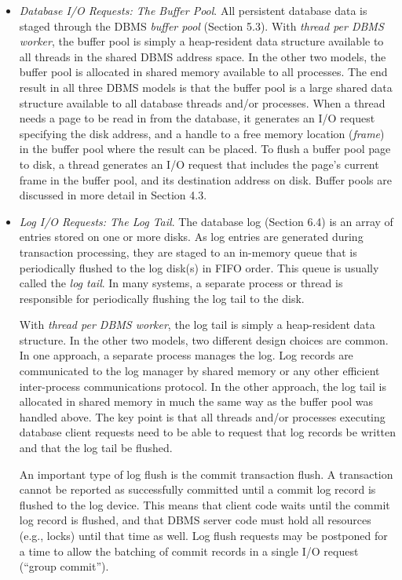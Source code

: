 \documentclass[a4paper,11pt,twoside,openright]{book}
\begin{document}
\begin{itemize}
\item
  \emph{Database I/O Requests: The Buffer Pool}. All persistent database
  data is staged through the DBMS \emph{buffer pool} (Section 5.3). With
  \emph{thread per DBMS worker}, the buffer pool is simply a
  heap-resident data structure available to all threads in the shared
  DBMS address space. In the other two models, the buffer pool is
  allocated in shared memory available to all processes. The end result
  in all three DBMS models is that the buffer pool is a large shared
  data structure available to all database threads and/or processes.
  When a thread needs a page to be read in from the database, it
  generates an I/O request specifying the disk address, and a handle to
  a free memory location (\emph{frame}) in the buffer pool where the
  result can be placed. To flush a buffer pool page to disk, a thread
  generates an I/O request that includes the page's current frame in the
  buffer pool, and its destination address on disk. Buffer pools are
  discussed in more detail in Section 4.3.
\item
  \emph{Log I/O Requests: The Log Tail}. The database log (Section 6.4)
  is an array of entries stored on one or more disks. As log entries are
  generated during transaction processing, they are staged to an
  in-memory queue that is periodically flushed to the log disk(s) in
  FIFO order. This queue is usually called the \emph{log tail}. In many
  systems, a separate process or thread is responsible for periodically
  flushing the log tail to the disk.

With \emph{thread per DBMS worker}, the log tail is simply a
heap-resident data structure. In the other two models, two different
design choices are common. In one approach, a separate process manages
the log. Log records are communicated to the log manager by shared
memory or any other efficient inter-process communications protocol. In
the other approach, the log tail is allocated in shared memory in much
the same way as the buffer pool was handled above. The key point is that
all threads and/or processes executing database client requests need to
be able to request that log records be written and that the log tail be
flushed.

An important type of log flush is the commit transaction flush. A
transaction cannot be reported as successfully committed until a commit
log record is flushed to the log device. This means that client code
waits until the commit log record is flushed, and that DBMS server code
must hold all resources (e.g., locks) until that time as well. Log flush
requests may be postponed for a time to allow the batching of commit
records in a single I/O request (``group commit'').
\end{itemize}
\end{document}
